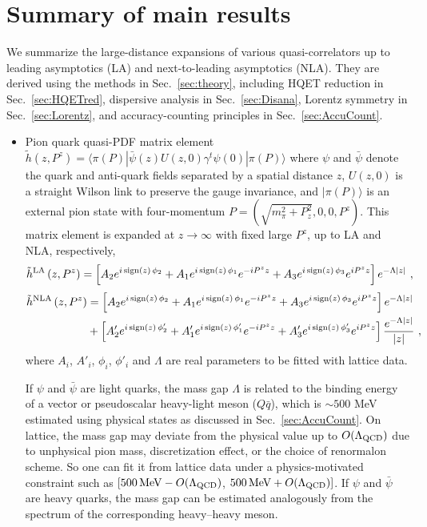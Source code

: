 \documentclass[a4paper,11pt]{article}
\begin{document}
\section{Summary of main results}\label{sec:summary}
We summarize the large-distance expansions of various quasi-correlators up to leading asymptotics (LA) and next-to-leading asymptotics (NLA). They are derived using the methods in Sec.~\ref{sec:theory}, including HQET reduction in Sec.~\ref{sec:HQETred}, dispersive analysis in Sec.~\ref{sec:Disana}, Lorentz symmetry in Sec.~\ref{sec:Lorentz}, and accuracy-counting principles in Sec.~\ref{sec:AccuCount}. 
\begin{itemize}
\item Pion quark quasi-PDF matrix element $\tilde{h}\left(z,P^z\right) =\langle \pi(P) | \bar{\psi}(z) U(z,0) \gamma^t \psi(0) | \pi(P)  \rangle$ where $\psi$ and $\bar{\psi}$ denote the quark and anti-quark fields separated by a spatial distance $z$, $U(z,0)$ is a straight Wilson link to preserve the gauge invariance, and $| \pi(P)  \rangle$ is an external pion state with four-momentum $P=\left(\sqrt{m_{\pi}^2+P_z^2},0,0,P^z\right)$. This matrix element is expanded at $z \rightarrow \infty$ with fixed large $P^z$, up to LA and NLA, respectively, 
\begin{align}
\tilde{h}^{\rm LA}\left(z,P^z\right) = 
\left[A_2 e^{i \, {\rm sign}(z) \, \phi_2} +  A_1 e^{i \, {\rm sign}(z) \, \phi_1} e^{-i P^z z} + A_3 e^{i \, {\rm sign}(z) \, \phi_3} e^{i P^z z} \right] e^{-\Lambda |z|}  \ ,
\end{align}
\begin{align}
\tilde{h}^{\rm NLA}\left(z,P^z\right) 
& = \left[A_2 e^{i \, {\rm sign}(z) \, \phi_2} +  A_1 e^{i \, {\rm sign}(z) \, \phi_1} e^{-i P^z z} + A_3 e^{i \, {\rm sign}(z) \, \phi_3} e^{i P^z z} \right] e^{-\Lambda |z|} \nonumber\\
& + \left[A'_2 e^{i \, {\rm sign}(z) \, \phi'_2} +  A'_1 e^{i \, {\rm sign}(z) \, \phi'_1} e^{-i P^z z} + A'_3 e^{i \, {\rm sign}(z) \, \phi'_3} e^{i P^z z} \right] \frac{e^{-\Lambda |z|}}{|z|} \ ,
\end{align}  
where $A_i$, $A'_i$, $\phi_i$, $\phi'_i$ and $\Lambda$ are real parameters to be fitted with lattice data. 

If $\psi$ and $\bar{\psi}$ are light quarks, the mass gap $\Lambda$ is related to the binding energy of a vector or pseudoscalar heavy-light meson ($Q \bar{q}$), which is $\sim 500$ MeV estimated using physical states as discussed in Sec.~\ref{sec:AccuCount}. On lattice, the mass gap may deviate from the physical value up to $O(\Lambda_{\rm QCD})$ due to unphysical pion mass, discretization effect, or the choice of renormalon scheme. So one can fit it from lattice data under a physics-motivated constraint such as $[500\,{\rm MeV}-O(\Lambda_{\rm QCD})$, $500\,{\rm MeV}+O(\Lambda_{\rm QCD})]$. If $\psi$ and $\bar{\psi}$ are heavy quarks, the mass gap can be estimated analogously from the spectrum of the corresponding heavy–heavy meson. 


\end{itemize}
\end{document}
